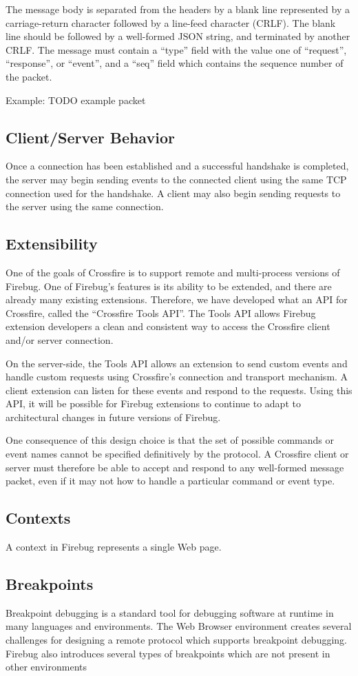 The message body is separated from the headers by a blank line
represented by a carriage-return character followed by a line-feed
character (CRLF).
The blank line should be followed by a well-formed JSON string, and terminated
by another CRLF. The message must contain a ``type'' field with the value one of
``request'', ``response'', or ``event'', and a ``seq'' field which contains the
sequence number of the packet.

Example:
TODO example packet

\subsection {Client/Server Behavior}
Once a connection has been established and a successful handshake is completed,
the server may begin sending events to the connected client using the same TCP
connection used for the handshake. A client may also begin sending requests to
the server using the same connection.

\subsection {Extensibility}
One of the goals of Crossfire is to support remote and multi-process versions of
Firebug. One of Firebug's features is its ability to be extended, and there are
already many existing extensions. Therefore, we have developed what an API for
Crossfire, called the ``Crossfire Tools API''. The Tools API allows Firebug
extension developers a clean and consistent way to access the Crossfire client
and/or server connection.

On the server-side, the Tools API allows an extension to send custom events
and handle custom requests using Crossfire's connection and transport mechanism.
A client extension can listen for these events and respond to the requests.
Using this API, it will be possible for Firebug extensions to continue to adapt
to architectural changes in future versions of Firebug.

One consequence of this design choice is that the set of possible commands or
event names cannot be specified definitively by the protocol. A Crossfire
client or server must therefore be able to accept and respond to any well-formed
message packet, even if it may not how to handle a particular command or event
type.

\subsection {Contexts}
A context in Firebug represents a single Web page.

\subsection {Breakpoints}
Breakpoint debugging is a standard tool for debugging software at runtime in
many languages and environments. The Web Browser environment creates several
challenges for designing a remote protocol which supports breakpoint debugging.
Firebug also introduces several types of breakpoints which are not present in
other environments \cite{jjb-www2010}
